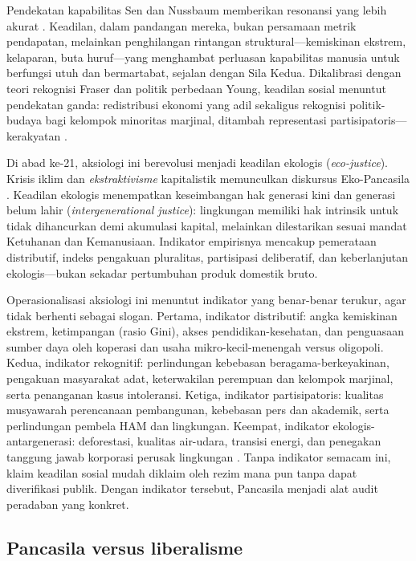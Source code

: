 \documentclass[journal]{IEEEtran}
\begin{document}
Pendekatan kapabilitas Sen dan Nussbaum memberikan resonansi yang lebih akurat \cite{sen1999,nussbaum2011}. Keadilan, dalam pandangan mereka, bukan persamaan metrik pendapatan, melainkan penghilangan rintangan struktural---kemiskinan ekstrem, kelaparan, buta huruf---yang menghambat perluasan kapabilitas manusia untuk berfungsi utuh dan bermartabat, sejalan dengan Sila Kedua. Dikalibrasi dengan teori rekognisi Fraser dan politik perbedaan Young, keadilan sosial menuntut pendekatan ganda: redistribusi ekonomi yang adil sekaligus rekognisi politik-budaya bagi kelompok minoritas marjinal, ditambah representasi partisipatoris---kerakyatan \cite{fraser2008,young1990,taylor1994}.

Di abad ke-21, aksiologi ini berevolusi menjadi keadilan ekologis (\textit{eco-justice}). Krisis iklim dan \textit{ekstraktivisme} kapitalistik memunculkan diskursus Eko-Pancasila \cite{yusa2022}. Keadilan ekologis menempatkan keseimbangan hak generasi kini dan generasi belum lahir (\textit{intergenerational justice}): lingkungan memiliki hak intrinsik untuk tidak dihancurkan demi akumulasi kapital, melainkan dilestarikan sesuai mandat Ketuhanan dan Kemanusiaan. Indikator empirisnya mencakup pemerataan distributif, indeks pengakuan pluralitas, partisipasi deliberatif, dan keberlanjutan ekologis---bukan sekadar pertumbuhan produk domestik bruto.

Operasionalisasi aksiologi ini menuntut indikator yang benar-benar terukur, agar tidak berhenti sebagai slogan. Pertama, indikator distributif: angka kemiskinan ekstrem, ketimpangan (rasio Gini), akses pendidikan-kesehatan, dan penguasaan sumber daya oleh koperasi dan usaha mikro-kecil-menengah versus oligopoli. Kedua, indikator rekognitif: perlindungan kebebasan beragama-berkeyakinan, pengakuan masyarakat adat, keterwakilan perempuan dan kelompok marjinal, serta penanganan kasus intoleransi. Ketiga, indikator partisipatoris: kualitas musyawarah perencanaan pembangunan, kebebasan pers dan akademik, serta perlindungan pembela HAM dan lingkungan. Keempat, indikator ekologis-antargenerasi: deforestasi, kualitas air-udara, transisi energi, dan penegakan tanggung jawab korporasi perusak lingkungan \cite{yusa2022,fraser2008,young1990,sen1999}. Tanpa indikator semacam ini, klaim keadilan sosial mudah diklaim oleh rezim mana pun tanpa dapat diverifikasi publik. Dengan indikator tersebut, Pancasila menjadi alat audit peradaban yang konkret.

\subsection{Pancasila versus liberalisme}
\end{document}
